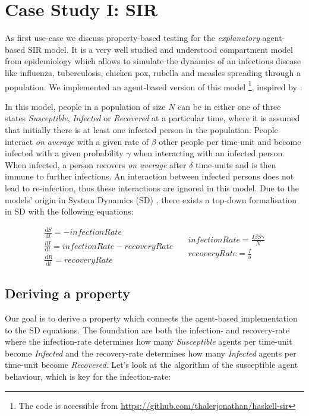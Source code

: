 \section{Case Study I: SIR}
\label{sec:case_SIR}
As first use-case we discuss property-based testing for the \textit{explanatory} agent-based SIR model. It is a very well studied and understood compartment model from epidemiology \cite{kermack_contribution_1927} which allows to simulate the dynamics of an infectious disease like influenza, tuberculosis, chicken pox, rubella and measles spreading through a population. We implemented an agent-based version of this model \footnote{The code is accessible from \url{https://github.com/thalerjonathan/haskell-sir}}, inspired by \cite{macal_agent-based_2010}.

In this model, people in a population of size $N$ can be in either one of three states \textit{Susceptible}, \textit{Infected} or \textit{Recovered} at a particular time, where it is assumed that initially there is at least one infected person in the population. People interact \textit{on average} with a given rate of $\beta$ other people per time-unit and become infected with a given probability $\gamma$ when interacting with an infected person. When infected, a person recovers \textit{on average} after $\delta$ time-units and is then immune to further infections. An interaction between infected persons does not lead to re-infection, thus these interactions are ignored in this model. Due to the models' origin in System Dynamics (SD) \cite{porter_industrial_1962}, there exists a top-down formalisation in SD with the following equations:

\begin{equation}
\begin{split}
\frac{\mathrm d S}{\mathrm d t} = -infectionRate \\
\frac{\mathrm d I}{\mathrm d t} = infectionRate - recoveryRate \\
\frac{\mathrm d R}{\mathrm d t} = recoveryRate 
\end{split}
\quad
\begin{split}
infectionRate = \frac{I \beta S \gamma}{N} \\
recoveryRate = \frac{I}{\delta} 
\end{split}
\end{equation}

\subsection{Deriving a property}
Our goal is to derive a property which connects the agent-based implementation to the SD equations. The foundation are both the infection- and recovery-rate where the infection-rate determines how many \textit{Susceptible} agents per time-unit become \textit{Infected} and the recovery-rate determines how many \textit{Infected} agents per time-unit become \textit{Recovered}. Let's look at the algorithm of the susceptible agent behaviour, which is key for the infection-rate:


